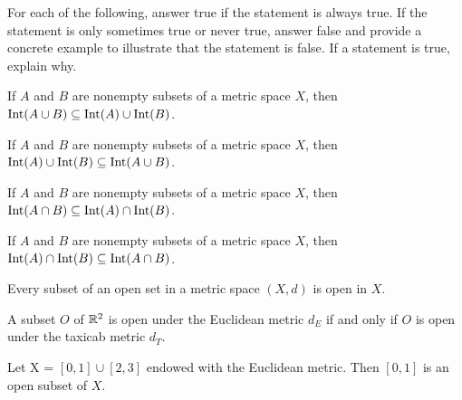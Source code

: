 \item For each of the following, answer true if the statement is always true. If the statement is only sometimes true or never true, answer false and provide a concrete example to illustrate that the statement is false. If a statement is true, explain why. 

	\ba
	
	\item If $A$ and $B$ are nonempty subsets of a metric space $X$, then $\text{Int}(A \cup B) \subseteq \text{Int}(A) \cup \text{Int}(B)$.

	\item If $A$ and $B$ are nonempty subsets of a metric space $X$, then $\text{Int}(A) \cup \text{Int}(B) \subseteq  \text{Int}(A \cup B)$.

	\item If $A$ and $B$ are nonempty subsets of a metric space $X$, then $\text{Int}(A \cap B) \subseteq \text{Int}(A) \cap \text{Int}(B)$.

	\item If $A$ and $B$ are nonempty subsets of a metric space $X$, then $\text{Int}(A) \cap \text{Int}(B) \subseteq  \text{Int}(A \cap B)$.

	\item Every subset of an open set in a metric space $(X,d)$ is open in $X$.

	\item A subset $O$ of $\mathbb{R}^2$ is open under the Euclidean metric $d_E$ if and only if $O$ is open under the taxicab metric $d_T$.
	
	\item Let X = $[0,1] \cup [2,3]$ endowed with the Euclidean metric. Then $[0, 1]$ is an open subset of $X$. 


		
	\ea

